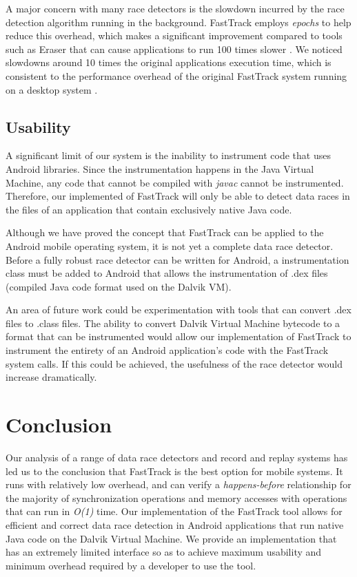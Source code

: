 \documentclass{acm_proc_article-sp}
\begin{document}
A major concern with many race detectors is the slowdown incurred by the race detection algorithm running in the background. FastTrack employs \emph{epochs} to help reduce this overhead, which makes a significant improvement compared to tools such as Eraser that can cause applications to run 100 times slower \cite{Savage1997}. We noticed slowdowns around 10 times the original applications execution time, which is consistent to the performance overhead of the original FastTrack system running on a desktop system \cite{Flanagan2010}.

\subsection{Usability}
A significant limit of our system is the inability to instrument code that uses Android libraries. Since the instrumentation happens in the Java Virtual Machine, any code that cannot be compiled with \emph{javac} cannot be instrumented. Therefore, our implemented of FastTrack will only be able to detect data races in the files of an application that contain exclusively native Java code.

Although we have proved the concept that FastTrack can be applied to the Android mobile operating system, it is not yet a complete data race detector. Before a fully robust race detector can be written for Android, a instrumentation class must be added to Android that allows the instrumentation of .dex files (compiled Java code format used on the Dalvik VM).

An area of future work could be experimentation with tools that can convert .dex files to .class files. The ability to convert Dalvik Virtual Machine bytecode to a format that can be instrumented would allow our implementation of FastTrack to instrument the entirety of an Android application's code with the FastTrack system calls. If this could be achieved, the usefulness of the race detector would increase dramatically.


\section{Conclusion} 
Our analysis of a range of data race detectors and record and replay systems has led us to the conclusion that FastTrack is the best option for mobile systems. It runs with relatively low overhead, and can verify a \emph{happens-before} relationship for the majority of synchronization operations and memory accesses with operations that can run in \emph{O(1)} time. Our implementation of the FastTrack tool allows for efficient and correct data race detection in Android applications that run native Java code on the Dalvik Virtual Machine. We provide an implementation that has an extremely limited interface so as to achieve maximum usability and minimum overhead required by a developer to use the tool.



\end{document}
